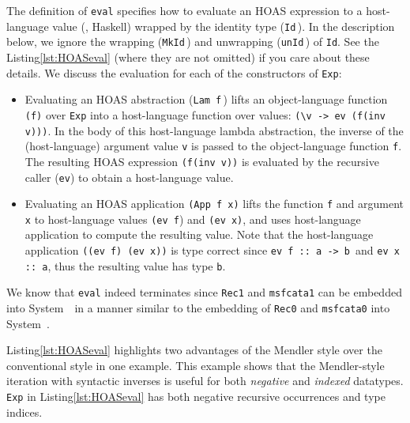 The definition of \lstinline{eval} specifies how to evaluate
an HOAS expression to a host-language value (\ie, Haskell) wrapped by
the identity type (\lstinline{Id}\,). In the description below, we ignore
the wrapping (\lstinline{MkId}\,) and unwrapping (\lstinline{unId}\,) of
\lstinline{Id}. %
See the Listing\;\ref{lst:HOASeval} (where they are not omitted)
if you care about these details. We discuss the evaluation for each of
the constructors of \lstinline{Exp}:
\begin{itemize}
	\item Evaluating an HOAS abstraction (\lstinline{Lam f}\,) lifts
		an object-language function \lstinline{(f)} over \lstinline{Exp}
		into a host-language function over values:
		\lstinline{(\v -> ev (f(inv v)))}.
		In the body of this host-language lambda abstraction,
		the inverse of the (host-language) argument value \lstinline{v}
		is passed to the object-language function \lstinline{f}.
		The resulting HOAS expression \lstinline{(f(inv v))} is
		evaluated by the recursive caller (\lstinline{ev}) to
		obtain a host-language value.

	\item Evaluating an HOAS application \lstinline{(App f x)} lifts
		the function \lstinline{f} and argument \lstinline{x} to
		host-language values \lstinline{(ev f}) and \lstinline{(ev x)},
		and uses host-language application to compute
		the resulting value. Note that the host-language application
		\lstinline{((ev f) (ev x))} is type correct since
		\lstinline{ev f :: a -> b}\, and \lstinline{ev x :: a},
		thus the resulting value has type \lstinline{b}.
\end{itemize}
We know that \lstinline{eval} indeed terminates since \lstinline{Rec1} and
\lstinline{msfcata1} can be embedded into System~\Fw\ in a manner similar to
the embedding of \lstinline{Rec0} and \lstinline{msfcata0} into System~\Fw.



Listing\;\ref{lst:HOASeval} highlights two advantages of the Mendler style over
the conventional style in one example. This example shows that the Mendler-style
iteration with syntactic inverses is useful for both \textit{negative} and
\textit{indexed} datatypes. \lstinline{Exp} in Listing\;\ref{lst:HOASeval} has
both negative recursive occurrences and type indices.

